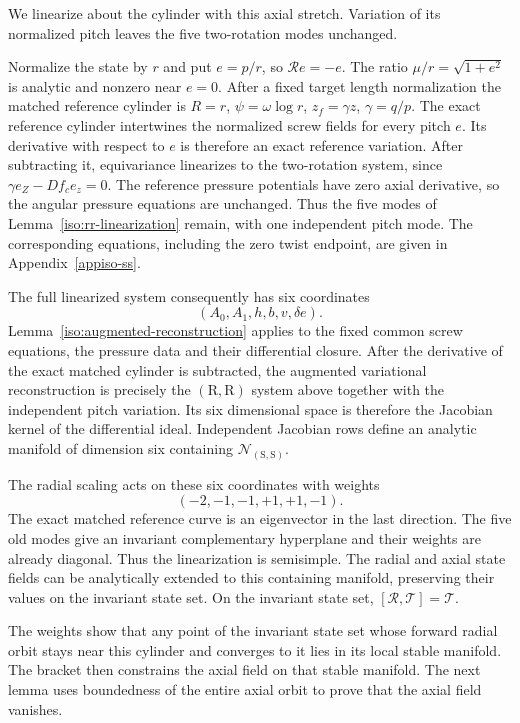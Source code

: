 \documentclass[11pt,a4paper]{article}
\numberwithin{equation}{section}
\theoremstyle{plain}
\theoremstyle{definition}
\theoremstyle{remark}
\begin{document}
We linearize about the cylinder with this axial stretch. Variation of its normalized pitch leaves the five two-rotation modes unchanged.

Normalize the state by $r$ and put
$e=p/r$, so $\mathcal Re=-e$.  The ratio
$\mu/r=\sqrt{1+e^2}$ is analytic and nonzero near $e=0$.
After a fixed target length normalization the matched reference cylinder
is $R=r$, $\psi=\omega\log r$, $z_f=\gamma z$, $\gamma=q/p$.
The exact reference cylinder intertwines the normalized screw fields
for every pitch $e$. Its derivative with respect to $e$ is therefore
an exact reference variation. After subtracting it, equivariance
linearizes to the two-rotation system, since
$\gamma e_Z-Df_c e_z=0$. The reference pressure potentials have zero
axial derivative, so the angular pressure equations are unchanged.
Thus the five modes of Lemma~\ref{iso:rr-linearization} remain, with
one independent pitch mode. The corresponding equations, including
the zero twist endpoint, are given in Appendix~\ref{appiso-ss}.

The full linearized system consequently has six coordinates
\[
 (A_0,A_1,h,b,v,\delta e).
\]
Lemma~\ref{iso:augmented-reconstruction} applies to the fixed common
screw equations, the pressure data and their differential
closure. After the derivative of the exact matched cylinder is
subtracted, the augmented variational reconstruction is precisely
the $(\mathrm{R},\mathrm{R})$ system above together with the independent pitch variation.
Its six dimensional space is therefore the Jacobian kernel of the
differential ideal. Independent Jacobian rows define an analytic
manifold of dimension six containing $\mathscr N_{(\mathrm{S},\mathrm{S})}$.

The radial scaling acts on these six coordinates with weights
\begin{equation}\label{iso:ss-weights}
 (-2,-1,-1,+1,+1,-1).
\end{equation}
The exact matched reference curve is an eigenvector in the last direction.
The five old modes give an invariant complementary hyperplane and their
weights are already diagonal.  Thus the linearization is semisimple.
The radial and axial state fields can be analytically extended to this
containing manifold, preserving their values on the invariant state set.  On the invariant state set, $[\mathcal R,\mathcal T]=\mathcal T$.

The weights show that any point of the invariant state set whose forward radial orbit
stays near this cylinder and converges to it lies in its local stable
manifold.  The bracket then constrains the axial field on that stable
manifold.  The next lemma uses boundedness of the entire axial orbit
to prove that the axial field vanishes.
\end{document}
